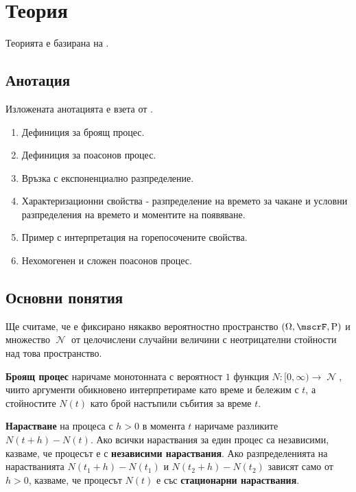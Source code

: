 \documentclass{../../common/topic}
\begin{document}
\maketitle

\section{Теория}

Теорията е базирана на \cite{Божкова2012Лекции}.

\subsection{Анотация}

Изложената анотацията е взета от \cite{Syllabus}.

\begin{enumerate}
  \item Дефиниция за броящ процес.
  \item Дефиниция за поасонов процес.
  \item Връзка с експоненциално разпределение.
  \item Характеризационни свойства - разпределение на времето за чакане и условни разпределения на времето и моментите на появяване.
  \item Пример с интерпретация на горепосочените свойства.
  \item Нехомогенен и сложен поасонов процес.
\end{enumerate}

\subsection{Основни понятия}

Ще считаме, че е фиксирано някакво вероятностно пространство \( (\Omega, \mscrF, \Prob) \) и множество \( \mscrN \) от целочислени случайни величини с неотрицателни стойности над това пространство.

\makeatletter
\setcounter{counters@theorem}{-1}
\makeatother
\begin{definition}
  \textbf{Броящ процес} наричаме монотонната с вероятност \( 1 \) функция \( N: [0, \infty) \to \mscrN \), чиито аргументи обикновено интерпретираме като време и бележим с \( t \), а стойностите \( N(t) \) като брой настъпили събития за време \( t \).

  \textbf{Нарастване} на процеса с \( h > 0 \) в момента \( t \) наричаме разликите \( N(t+h) - N(t) \). Ако всички нараствания за един процес са независими, казваме, че процесът е с \textbf{независими нараствания}. Ако разпределенията на нарастванията \( N(t_1+h) - N(t_1) \) и \( N(t_2+h) - N(t_2) \) зависят само от \( h>0 \), казваме, че процесът \( N(t) \) е със \textbf{стационарни нараствания}.
\end{definition}
\end{document}
